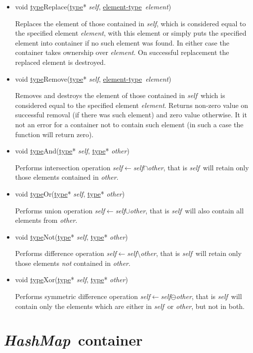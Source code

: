 \documentclass[a4paper]{article}
\newcommand{\st}{\underline{type}}
\newcommand{\et}{\underline{element-type}}
\newcommand{\sv}{\emph{self}}
\newcommand{\ov}{\emph{other}}
\newcommand{\ev}{\emph{element}}
\newcommand{\meth}[1]{#1}
\begin{document}
\begin{itemize}
\item \meth{void \st Replace(\st* \sv, \et\ \ev)}


Replaces the element of those contained in \sv, which is considered equal to the specified element \ev, with this element or simply puts the specified element into container if no such element was found.
In either case the container takes ownership over \ev.
On successful replacement the replaced element is destroyed.


\item \meth{void \st Remove(\st* \sv, \et\ \ev)}


Removes and destroys the element of those contained in \sv\ which is considered equal to the specified element \ev.
Returns non-zero value on successful removal (if there was such element) and zero value otherwise.
It it not an error for a container not to contain such element (in such a case the function will return zero).


\item \meth{void \st And(\st* \sv, \st* \ov)}


Performs intersection operation \sv$\leftarrow$\sv$\cap$\ov, that is \sv\ will retain only those elements contained in \ov.


\item \meth{void \st Or(\st* \sv, \st* \ov)}


Performs union operation \sv$\leftarrow$\sv$\cup$\ov, that is \sv\ will also contain all elements from \ov.


\item \meth{void \st Not(\st* \sv, \st* \ov)}


Performs difference operation \sv$\leftarrow$\sv$\setminus$\ov, that is \sv\ will retain only those elements \emph{not} contained in \ov.


\item \meth{void \st Xor(\st* \sv, \st* \ov)}


Performs symmetric difference operation \sv$\leftarrow$\sv$\ominus$\ov, that is \sv\ will contain only the elements which are either in \sv\ or \ov, but not in both.


\end{itemize}




\newcommand{\Hashmap}{\emph{HashMap}}
\section{\Hashmap\ container}
\end{document}
